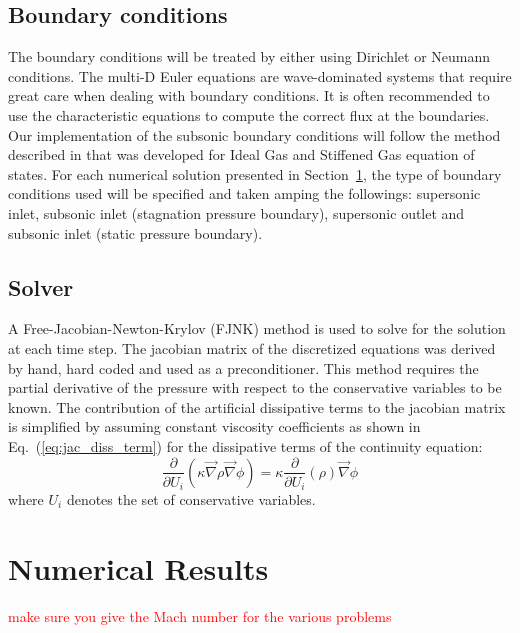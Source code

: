 \documentclass[preprint,10pt]{elsarticle}
\newcommand{\grad}{\vec{\nabla}}
\newcommand{\eqt}[1]{Eq.~(\ref{#1})}                     %
\newcommand{\sct}[1]{Section~\ref{#1}}                   %
\newcommand{\tcr}[1]{\textcolor{red}{#1}}
\begin{document}
\subsection{Boundary conditions} \label{sec:bc}
The boundary conditions will be treated by either using Dirichlet or Neumann conditions. The multi-D Euler equations are wave-dominated systems that require great care when dealing with boundary conditions. It is often recommended to use the characteristic equations to compute the correct flux at the boundaries. Our implementation of the subsonic boundary conditions will follow the method described in \cite{SEM} that was developed for Ideal Gas and Stiffened Gas equation of states. For each numerical solution presented in \sct{sec:results}, the type of boundary conditions used will be specified and taken amping the followings: supersonic inlet, subsonic inlet (stagnation pressure boundary), supersonic outlet and subsonic inlet (static pressure boundary).
\subsection{Solver} \label{sec:solver}
A Free-Jacobian-Newton-Krylov (FJNK) method is used to solve for the solution at each time step. The jacobian matrix of the discretized equations was derived by hand, hard coded and used as a preconditioner. This method requires the partial derivative of the pressure with respect to the conservative variables to be known. The contribution of the artificial dissipative terms to the jacobian matrix is simplified by assuming constant viscosity coefficients as shown in \eqt{eq:jac_diss_term} for the dissipative terms of the continuity equation:
\begin{equation}
\label{eq:jac_diss_term}
\frac{\partial}{\partial U_i} \left( \kappa \grad \rho \grad \phi \right) = \kappa \frac{\partial}{\partial U_i} \left( \rho \right) \grad \phi
\end{equation}  
where $U_i$ denotes the set of conservative variables.
\section{Numerical Results} \label{sec:results}
\tcr{make sure you give the Mach number for the various problems}
\end{document}
